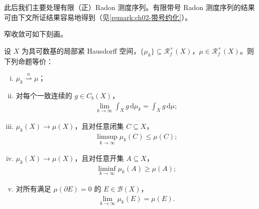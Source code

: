 \documentclass[../../main.tex]{subfiles}%
\begin{document}
此后我们主要处理有限（正）Radon 测度序列。有限带号 Radon 测度序列的结果可由下文所证结果容易地得到（见\cref{remark:ch02-带号约化}）。

窄收敛可如下刻画。

\begin{theorem}[Portmanteau 定理]\label{theorem:ch05-portmanteau}
设 $X$ 为具可数基的局部紧 Hausdorff 空间，$\{\mu_k\}\subseteq\mathscr{R}^+_f(X)$，$\mu\in\mathscr{R}^+_f(X)$。则下列命题等价：
\begin{enumerate}[(i)]
\item\label{item:ch05-port-i} $\mu_k\stackrel{n}{\rightharpoonup}\mu$；
\item\label{item:ch05-port-ii} 对每个一致连续的 $g\in C_b(X)$，
\begin{align}
\lim_{k\to\infty}\int_X g\,\mathrm{d}\mu_k=\int_X g\,\mathrm{d}\mu;\label{align:ch05-5.6}
\end{align}
\item\label{item:ch05-port-iii} $\mu_k(X)\to\mu(X)$，且对任意闭集 $C\subseteq X$，
\begin{align}
\limsup_{k\to\infty}\mu_k(C)\leqslant\mu(C);\label{align:ch05-5.7}
\end{align}
\item\label{item:ch05-port-iv} $\mu_k(X)\to\mu(X)$，且对任意开集 $A\subseteq X$，
\begin{align}
\liminf_{k\to\infty}\mu_k(A)\geqslant\mu(A);\label{align:ch05-5.8}
\end{align}
\item\label{item:ch05-port-v} 对所有满足 $\mu(\partial E)=0$ 的 $E\in\mathscr{B}(X)$，
\begin{align}
\lim_{k\to\infty}\mu_k(E)=\mu(E).\label{align:ch05-5.9}
\end{align}
\end{enumerate}
\end{theorem}
\end{document}
